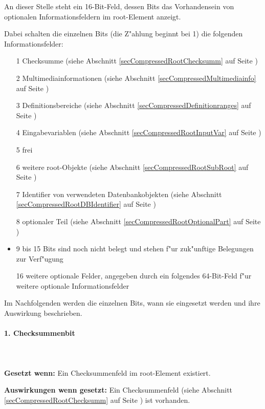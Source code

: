 An dieser Stelle steht ein 16-Bit-Feld, dessen Bits das Vorhandensein von optionalen Informationsfeldern im root-Element anzeigt.

\bigskip\noindent
Dabei schalten die einzelnen Bits (die Z"ahlung beginnt bei 1) die folgenden Informationsfelder:
\begin{itemize}
 \item [1] Checksumme (siehe Abschnitt \ref{secCompressedRootChecksumm} auf Seite \pageref{secCompressedRootChecksumm})
 \item [2] Multimediainformationen (siehe Abschnitt \ref{secCompressedMultimediainfo} auf Seite \pageref{secCompressedMultimediainfo})
 \item [3] Definitionsbereiche (siehe Abschnitt \ref{secCompressedDefinitionranges} auf Seite \pageref{secCompressedDefinitionranges})
 \item [4] Eingabevariablen (siehe Abschnitt \ref{secCompressedRootInputVar} auf Seite \pageref{secCompressedRootInputVar})
 \item [5] frei
 \item [6] weitere root-Objekte (siehe Abschnitt \ref{secCompressedRootSubRoot} auf Seite \pageref{secCompressedRootSubRoot})
 \item [7] Identifier von verwendeten Datenbankobjekten (siehe Abschnitt \ref{secCompressedRootDBIdentifier} auf Seite \pageref{secCompressedRootDBIdentifier})
 \item [8] optionaler Teil (siehe Abschnitt \ref{secCompressedRootOptionalPart} auf Seite \pageref{secCompressedRootOptionalPart})
 \item 9 bis 15 Bits sind noch nicht belegt und stehen f"ur zuk"unftige Belegungen zur Verf"ugung
 \item [16] weitere optionale Felder, angegeben durch ein folgendes 64-Bit-Feld f"ur weitere optionale Informationsfelder
\end{itemize}

Im Nachfolgenden werden die einzelnen Bits, wann sie eingesetzt werden und ihre Auswirkung beschrieben.


\paragraph{1. Checksummenbit}

\ \\\\\noindent
\textbf{Gesetzt wenn:} Ein Checksummenfeld im root-Element existiert.

\bigskip\noindent
\textbf{Auswirkungen wenn gesetzt:}
Ein Checksummenfeld (siehe Abschnitt \ref{secCompressedRootChecksumm} auf Seite \pageref{secCompressedRootChecksumm}) ist vorhanden.

